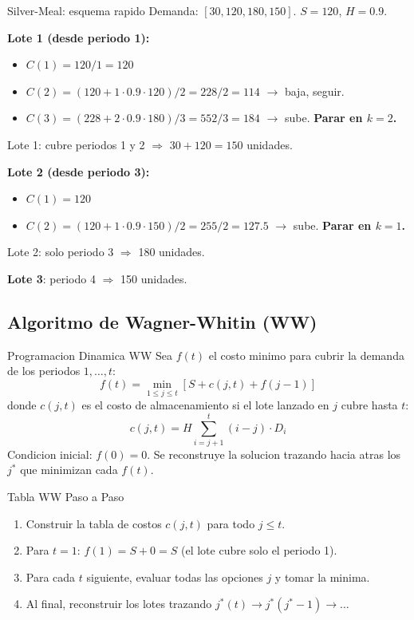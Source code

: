 \documentclass[11pt, a4paper]{article}
\begin{document}
\begin{ejercicio}{Silver-Meal: esquema rapido}
  Demanda: $[30, 120, 180, 150]$. $S = 120$, $H = 0.9$.

  \medskip
  \textbf{Lote 1 (desde periodo 1):}
  \begin{itemize}[leftmargin=1.5em, itemsep=1pt]
    \item $C(1) = 120 / 1 = 120$
    \item $C(2) = (120 + 1 \cdot 0.9 \cdot 120) / 2 = 228 / 2 = 114$ $\to$ baja, seguir.
    \item $C(3) = (228 + 2 \cdot 0.9 \cdot 180) / 3 = 552 / 3 = 184$ $\to$ sube. \textbf{Parar en $k=2$.}
  \end{itemize}
  Lote 1: cubre periodos 1 y 2 $\Rightarrow$ $30 + 120 = 150$ unidades.

  \medskip
  \textbf{Lote 2 (desde periodo 3):}
  \begin{itemize}[leftmargin=1.5em, itemsep=1pt]
    \item $C(1) = 120$
    \item $C(2) = (120 + 1 \cdot 0.9 \cdot 150) / 2 = 255 / 2 = 127.5$ $\to$ sube. \textbf{Parar en $k=1$.}
  \end{itemize}
  Lote 2: solo periodo 3 $\Rightarrow$ 180 unidades.

  \textbf{Lote 3}: periodo 4 $\Rightarrow$ 150 unidades.
\end{ejercicio}

\subsection{Algoritmo de Wagner-Whitin (WW)}

\begin{formulas}{Programacion Dinamica WW}
  Sea $f(t)$ el costo minimo para cubrir la demanda de los periodos $1, \ldots, t$:
  \[
    f(t) = \min_{1 \le j \le t} \left[ S + c(j, t) + f(j-1) \right]
  \]
  donde $c(j, t)$ es el costo de almacenamiento si el lote lanzado en $j$ cubre
  hasta $t$:
  \[
    c(j, t) = H \sum_{i=j+1}^{t} (i - j) \cdot D_i
  \]
  Condicion inicial: $f(0) = 0$.
  Se reconstruye la solucion trazando hacia atras los $j^*$ que minimizan cada $f(t)$.
\end{formulas}

\begin{tipprueba}{Tabla WW Paso a Paso}
  \begin{enumerate}[leftmargin=1.5em, itemsep=2pt]
    \item Construir la tabla de costos $c(j,t)$ para todo $j \le t$.
    \item Para $t = 1$: $f(1) = S + 0 = S$ (el lote cubre solo el periodo 1).
    \item Para cada $t$ siguiente, evaluar todas las opciones $j$ y tomar la minima.
    \item Al final, reconstruir los lotes trazando $j^*(t) \to j^*(j^*-1) \to \ldots$
  \end{enumerate}
\end{tipprueba}
\end{document}
